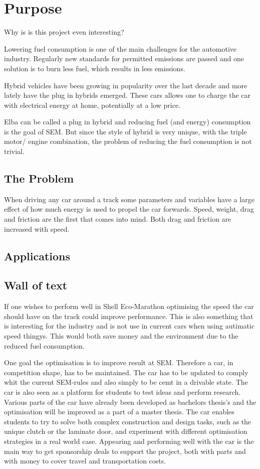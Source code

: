 \chapter{Purpose}

Why is is this project even interesting?

Lowering fuel consumption is one of the main challenges for the automotive 
industry. Regularly new standards for permitted emissions are passed and  
one solution is to burn less fuel, which results in less emissions.

Hybrid vehicles have been growing in popularity over the last decade and 
more lately have the plug in hybrids emerged. These cars allows one 
to charge the car with electrical energy at home, potentially at a low price.

Elba can be called a plug in hybrid and reducing fuel (and energy) consumption is the goal
of SEM\@. But since the style of hybrid is very unique, with the triple motor/ engine
combination, the problem of reducing the fuel consumption is not trivial. 

\section{The Problem}
When driving any car around a track some parameters and variables have a large effect of
how much energy is used to propel the car forwards. Speed, weight, drag and friction are
the first that comes into mind. Both drag and friction are increased with speed.

\section{Applications}

\section{Wall of text}
If one wishes to perform well in Shell Eco-Marathon optimising the speed the car should have on the track could improve performance. 
This is also something that is interesting for the industry and is not use in current cars when using autimatic speed thingys. This would both save money and the environment due to the reduced fuel consumption.

One goal the optimisation is to improve result at SEM\@. Therefore a car, in competition shape, has to be maintained. The car has to be updated to comply whit the current SEM-rules and also simply to be cemt in a drivable state. The car is also seen as a platform for students to test ideas and perform research. Various parts of the car have already been developed as bachelors thesis's and the optimisation will be improved as a part of a master thesis. The car enables students to try to solve both complex construction and design tasks, such as the unique clutch or the laminate door, and experiment with different optimisation strategies in a real world case. Appearing and performing well with the car is the main way to get sponsorship deals to support the project, both with parts and with money to cover travel and transportation costs.

